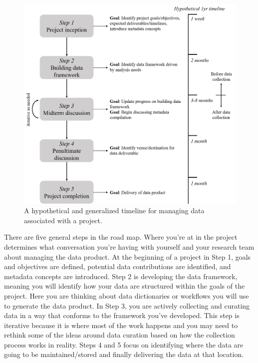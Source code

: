 \documentclass[
]{book}
\begin{document}
\begin{figure}

{\centering \includegraphics[width=1\linewidth]{img/dataworkflow} 

}

\caption{A hypothetical and generalized timeline for managing data associated with a project.}\label{fig:dataworkflow}
\end{figure}

There are five general steps in the road map. Where you're at in the project determines what conversation you're having with yourself and your research team about managing the data product. At the beginning of a project in Step 1, goals and objectives are defined, potential data contributions are identified, and metadata concepts are introduced. Step 2 is developing the data framework, meaning you will identify how your data are structured within the goals of the project. Here you are thinking about data dictionaries or workflows you will use to generate the data product. In Step 3, you are actively collecting and curating data in a way that conforms to the framework you've developed. This step is iterative because it is where most of the work happens and you may need to rethink some of the ideas around data curation based on how the collection process works in reality. Steps 4 and 5 focus on identifying where the data are going to be maintained/stored and finally delivering the data at that location.
\end{document}
